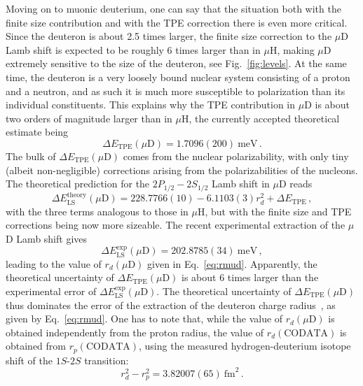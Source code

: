 \documentclass[prl,
twocolumn,
showpacs,preprintnumbers,amsmath,amssymb,
superscriptaddress,
a4paper,nofootinbib,longbibliography]{revtex4-2}
\begin{document}
Moving on to muonic deuterium, one can say that the situation both with the finite size contribution and with the TPE correction there is even more critical.
Since the deuteron is about 2.5 times larger, the finite size correction to the $\mu$D Lamb shift is expected to be roughly 6 times
larger than in $\mu$H, making $\mu$D extremely sensitive to the size of the deuteron, see Fig.~\ref{fig:levels}. At the same time, the deuteron is a very loosely bound nuclear system
consisting of a proton and a neutron, and as such it is much more susceptible to polarization than its individual constituents.
This explains why the TPE contribution in $\mu$D is about two orders of magnitude larger than in $\mu$H,
the currently accepted theoretical estimate being~\cite{Krauth:2015nja}
\begin{equation}
\Delta E_\text{TPE}(\mu\text{D})=1.7096(200)\ \text{meV}\,.
\label{eq:Delta_E_theor_mud}
\end{equation}
The bulk of $\Delta E_\text{TPE}(\mu\text{D})$ comes from the nuclear polarizability, with only
tiny (albeit non-negligible) corrections arising from the polarizabilities of the nucleons. 
The theoretical prediction for the $2P_{1/2}-2S_{1/2}$ Lamb shift in $\mu$D reads
\begin{equation}
\Delta E^\text{theory}_\text{LS}(\mu\text{D})=228.7766(10)-6.1103(3)r^2_d+\Delta E_\text{TPE}\,,
\label{eq:LS_theor_mud}
\end{equation}
with the three terms analogous to those in $\mu$H, but with the finite size and TPE corrections being now more sizeable.
The recent experimental extraction of the $\mu$D Lamb shift gives~\cite{Pohl1:2016xoo}
\begin{equation}
\Delta E^\text{exp}_\text{LS}(\mu\text{D})=202.8785(34)\ \text{meV}\,,
\end{equation}
leading to the value of $r_d(\mu\text{D})$ given in Eq.~\eqref{eq:rmud}.
Apparently, the theoretical uncertainty of $\Delta E_\text{TPE}(\mu\text{D})$ is about $6$ times
larger than the experimental error of $\Delta E^\text{exp}_\text{LS}(\mu\text{D})$.
The theoretical uncertainty of $\Delta E_\text{TPE}(\mu\text{D})$ thus dominates the error of the extraction of the deuteron charge radius~\cite{Pohl1:2016xoo},
as given by Eq.~\eqref{eq:rmud}. One has to note that, while the value of $r_d(\mu\text{D})$ is obtained independently from
the proton radius, the value of $r_d(\text{CODATA})$ is obtained from $r_p(\text{CODATA})$, using the measured hydrogen-deuterium
isotope shift of the $1S$-$2S$ transition:
\begin{equation}
r_d^2-r_p^2=3.82007(65)\ \text{fm}^2\,.
\label{eq:iso_shift}
\end{equation}
\end{document}
